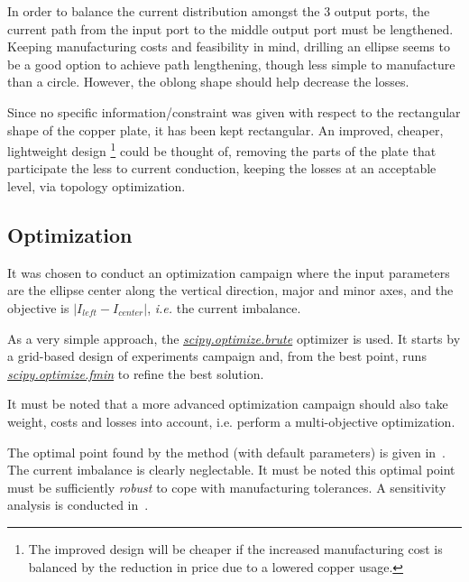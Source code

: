 \documentclass[10pt,a4paper]{article}
\begin{document}
In order to balance the current distribution amongst the 3 output ports,
the current path from the input port to the middle output port must be lengthened.
Keeping manufacturing costs and feasibility in mind, drilling an ellipse seems to be a good option
to achieve path lengthening, though less simple to manufacture than a circle.
However, the oblong shape should help decrease the losses.

Since no specific information/constraint was given with respect to the rectangular shape
of the copper plate, it has been kept rectangular.
An improved, cheaper,
lightweight design
\footnote{The improved design will be cheaper if the increased manufacturing cost is balanced
by the reduction in price due to a lowered copper usage.}
could be thought of,
removing the parts of the plate that participate the less to current
conduction, keeping the losses at an acceptable level, via topology optimization.

\subsection{Optimization}

It was chosen to conduct an optimization campaign where the input parameters are the
ellipse center along the vertical direction, major and minor axes, and the objective
is $\left| I_{left}-I_{center}\right|$, \emph{i.e.} the current imbalance.

As a very simple approach, the \href{
    https://docs.scipy.org/doc/scipy/reference/generated/scipy.optimize.brute.html
}{\emph{scipy.optimize.brute}} optimizer is used. It starts by a grid-based design of experiments campaign
and, from the best point, runs \href{
    https://docs.scipy.org/doc/scipy/reference/generated/scipy.optimize.fmin.html
}{\emph{scipy.optimize.fmin}} to refine the best solution.

It must be noted that a more advanced optimization campaign should also take weight, costs and losses into account,
i.e. perform a multi-objective optimization.

The optimal point found by the method (with default parameters) is given in~.
The current imbalance is clearly neglectable.
It must be noted this optimal point must be sufficiently \emph{robust} to
cope with manufacturing tolerances. A sensitivity analysis is conducted in~.
\end{document}
